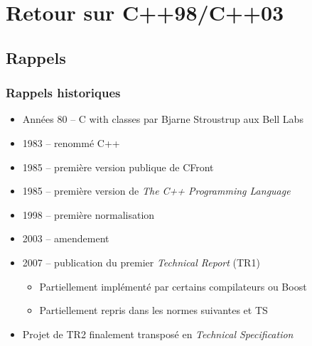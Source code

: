 \documentclass[C++.tex]{subfiles}
\begin{document}
\section{Retour sur C++98/C++03}
\subsection*{Rappels}
\begin{frame}[fragile]
	\frametitle{Rappels historiques}
	\begin{itemize}
		\item Années 80 -- \og C with classes\fg{} par Bjarne Stroustrup aux Bell Labs
		\item 1983 -- renommé C++
		\item 1985 -- première version publique de CFront 
		\item 1985 -- première version de \textit{The C++ Programming Language} 
		\item 1998 -- première normalisation
		\item 2003 -- amendement
		\item 2007 -- publication du premier \textit{Technical Report} (TR1)


		\begin{itemize}
			\item Partiellement implémenté par certains compilateurs ou Boost
			\item Partiellement repris dans les normes suivantes et TS


		\end{itemize}
		\item Projet de TR2 finalement transposé en \textit{Technical Specification}

	\end{itemize}
\end{frame}
\end{document}
